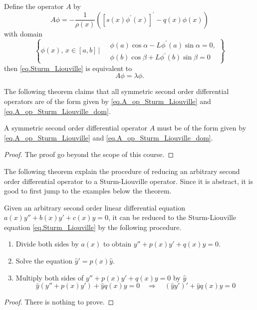 Define the operator $A$ by 
\begin{equation}\label{eq.A_op_Sturm_Liouville}
    A \phi = - \frac{1}{\rho(x)}\left(\left[s(x) \phi^{\prime}(x)\right]^{\prime}-q(x) \phi(x)\right)
\end{equation}
with domain
\begin{equation}\label{eq.A_op_Sturm_Liouville_dom}
    \left\{\phi(x),\, x\in [a, b]\,\Bigg|\begin{aligned}
        &\ \phi(a) \cos \alpha-L \phi^{\prime}(a) \sin \alpha=0,
        \\
        &\ \phi(b) \cos \beta+L \phi^{\prime}(b) \sin \beta=0
    \end{aligned}
    \right\}
\end{equation}
then \eqref{eq.Sturm_Liouville} is equivalent to
\begin{equation}\label{eq.Sturm_Liouville'}
    A \phi = \lambda \phi.
\end{equation}


The following theorem claims that all symmetric second order differential operators are of the form given by \eqref{eq.A_op_Sturm_Liouville} and \eqref{eq.A_op_Sturm_Liouville_dom}.

\begin{theorem}
    A symmetric second order differential operator $A$ must be of the form given by \eqref{eq.A_op_Sturm_Liouville} and \eqref{eq.A_op_Sturm_Liouville_dom}.
\end{theorem}
\begin{proof}
    The proof go beyond the scope of this course.
\end{proof}

The following theorem explain the procedure of reducing an arbitrary second order differential operator to a Sturm-Liouville operator. Since it is abstract, it is good to first jump to the examples below the theorem.
\begin{theorem}[]\label{th.reduction_to_SL}
    Given an arbitrary second order linear differential equation $a(x)y'' + b(x)y' + c(x)y = 0$, it can be reduced to the Sturm-Liouville equation \eqref{eq.Sturm_Liouville} by the following procedure.
    \begin{enumerate}
        \item Divide both sides by $a(x)$ to obtain $y'' + p(x)y' + q(x)y = 0$.
        \item Solve the equation $\widehat{y}' = p(x)\widehat{y}$.
        \item Multiply both sides of $y'' + p(x)y' + q(x)y = 0$ by $\widehat{y}$
        \begin{equation}
            \widehat{y}(y'' + p(x)y') + \widehat{y}q(x)y = 0\quad \Rightarrow\quad (\widehat{y}y')' + \widehat{y}q(x)y = 0
        \end{equation}
    \end{enumerate}
\end{theorem}
\begin{proof}
    There is nothing to prove.
\end{proof}

